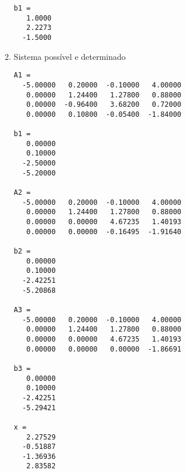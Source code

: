 \documentclass[a4paper]{article}
\begin{document}
\begin{enumerate}
\begin{enumerate}
\begin{verbatim}
b1 =
   1.0000
   2.2273
  -1.5000
\end{verbatim}

  \item Sistema possível e determinado
\begin{verbatim}
A1 =
  -5.00000   0.20000  -0.10000   4.00000
   0.00000   1.24400   1.27800   0.88000
   0.00000  -0.96400   3.68200   0.72000
   0.00000   0.10800  -0.05400  -1.84000

b1 =
   0.00000
   0.10000
  -2.50000
  -5.20000

A2 =
  -5.00000   0.20000  -0.10000   4.00000
   0.00000   1.24400   1.27800   0.88000
   0.00000   0.00000   4.67235   1.40193
   0.00000   0.00000  -0.16495  -1.91640

b2 =
   0.00000
   0.10000
  -2.42251
  -5.20868

A3 =
  -5.00000   0.20000  -0.10000   4.00000
   0.00000   1.24400   1.27800   0.88000
   0.00000   0.00000   4.67235   1.40193
   0.00000   0.00000   0.00000  -1.86691

b3 =
   0.00000
   0.10000
  -2.42251
  -5.29421

x =
   2.27529
  -0.51887
  -1.36936
   2.83582
\end{verbatim}


\end{enumerate}
\end{enumerate}
\end{document}
